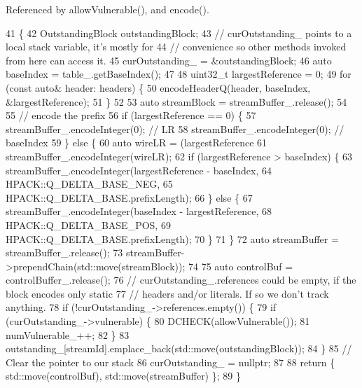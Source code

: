 Referenced by allow\+Vulnerable(), and encode().


\begin{DoxyCode}
41                                                                            \{
42   OutstandingBlock outstandingBlock;
43   \textcolor{comment}{// curOutstanding\_ points to a local stack variable, it's mostly for}
44   \textcolor{comment}{// convenience so other methods invoked from here can access it.}
45   curOutstanding_ = &outstandingBlock;
46   \textcolor{keyword}{auto} baseIndex = table_.getBaseIndex();
47 
48   uint32\_t largestReference = 0;
49   \textcolor{keywordflow}{for} (\textcolor{keyword}{const} \textcolor{keyword}{auto}& header: headers) \{
50     encodeHeaderQ(header, baseIndex, &largestReference);
51   \}
52 
53   \textcolor{keyword}{auto} streamBlock = streamBuffer_.release();
54 
55   \textcolor{comment}{// encode the prefix}
56   \textcolor{keywordflow}{if} (largestReference == 0) \{
57     streamBuffer_.encodeInteger(0); \textcolor{comment}{// LR}
58     streamBuffer_.encodeInteger(0); \textcolor{comment}{// baseIndex}
59   \} \textcolor{keywordflow}{else} \{
60     \textcolor{keyword}{auto} wireLR = (largestReference %
61     streamBuffer_.encodeInteger(wireLR);
62     \textcolor{keywordflow}{if} (largestReference > baseIndex) \{
63       streamBuffer_.encodeInteger(largestReference - baseIndex,
64                                   HPACK::Q_DELTA_BASE_NEG,
65                                   HPACK::Q_DELTA_BASE.prefixLength);
66     \} \textcolor{keywordflow}{else} \{
67       streamBuffer_.encodeInteger(baseIndex - largestReference,
68                                   HPACK::Q_DELTA_BASE_POS,
69                                   HPACK::Q_DELTA_BASE.prefixLength);
70     \}
71   \}
72   \textcolor{keyword}{auto} streamBuffer = streamBuffer_.release();
73   streamBuffer->prependChain(std::move(streamBlock));
74 
75   \textcolor{keyword}{auto} controlBuf = controlBuffer_.release();
76   \textcolor{comment}{// curOutstanding\_.references could be empty, if the block encodes only static}
77   \textcolor{comment}{// headers and/or literals.  If so we don't track anything.}
78   \textcolor{keywordflow}{if} (!curOutstanding_->references.empty()) \{
79     \textcolor{keywordflow}{if} (curOutstanding_->vulnerable) \{
80       DCHECK(allowVulnerable());
81       numVulnerable_++;
82     \}
83     outstanding_[streamId].emplace\_back(std::move(outstandingBlock));
84   \}
85   \textcolor{comment}{// Clear the pointer to our stack}
86   curOutstanding_ = \textcolor{keyword}{nullptr};
87 
88   \textcolor{keywordflow}{return} \{ std::move(controlBuf), std::move(streamBuffer) \};
89 \}
\end{DoxyCode}
